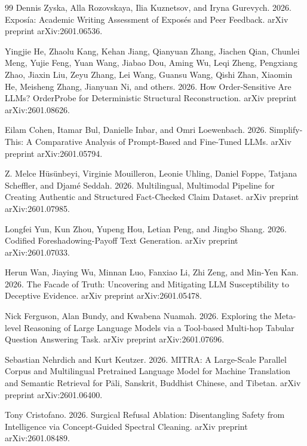 \documentclass{article}
\begin{document}
\begin{thebibliography}{99}
Dennis Zyska, Alla Rozovskaya, Ilia Kuznetsov, and Iryna Gurevych. 2026. Expos\'ia: Academic Writing Assessment of Expos\'es and Peer Feedback. arXiv preprint arXiv:2601.06536.

Yingjie He, Zhaolu Kang, Kehan Jiang, Qianyuan Zhang, Jiachen Qian, Chunlei Meng, Yujie Feng, Yuan Wang, Jiabao Dou, Aming Wu, Leqi Zheng, Pengxiang Zhao, Jiaxin Liu, Zeyu Zhang, Lei Wang, Guansu Wang, Qishi Zhan, Xiaomin He, Meisheng Zhang, Jianyuan Ni, and others. 2026. How Order-Sensitive Are LLMs? OrderProbe for Deterministic Structural Reconstruction. arXiv preprint arXiv:2601.08626.

Eilam Cohen, Itamar Bul, Danielle Inbar, and Omri Loewenbach. 2026. Simplify-This: A Comparative Analysis of Prompt-Based and Fine-Tuned LLMs. arXiv preprint arXiv:2601.05794.

Z. Melce Hüsünbeyi, Virginie Mouilleron, Leonie Uhling, Daniel Foppe, Tatjana Scheffler, and Djamé Seddah. 2026. Multilingual, Multimodal Pipeline for Creating Authentic and Structured Fact-Checked Claim Dataset. arXiv preprint arXiv:2601.07985.

Longfei Yun, Kun Zhou, Yupeng Hou, Letian Peng, and Jingbo Shang. 2026. Codified Foreshadowing-Payoff Text Generation. arXiv preprint arXiv:2601.07033.

Herun Wan, Jiaying Wu, Minnan Luo, Fanxiao Li, Zhi Zeng, and Min-Yen Kan. 2026. The Facade of Truth: Uncovering and Mitigating LLM Susceptibility to Deceptive Evidence. arXiv preprint arXiv:2601.05478.

Nick Ferguson, Alan Bundy, and Kwabena Nuamah. 2026. Exploring the Meta-level Reasoning of Large Language Models via a Tool-based Multi-hop Tabular Question Answering Task. arXiv preprint arXiv:2601.07696.

Sebastian Nehrdich and Kurt Keutzer. 2026. MITRA: A Large-Scale Parallel Corpus and Multilingual Pretrained Language Model for Machine Translation and Semantic Retrieval for P\=ali, Sanskrit, Buddhist Chinese, and Tibetan. arXiv preprint arXiv:2601.06400.

Tony Cristofano. 2026. Surgical Refusal Ablation: Disentangling Safety from Intelligence via Concept-Guided Spectral Cleaning. arXiv preprint arXiv:2601.08489.


\end{thebibliography}
\end{document}
